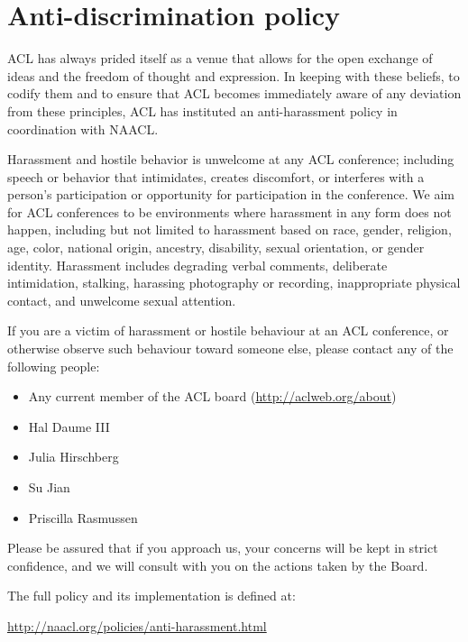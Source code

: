 \section[Anti-discrimination policy]{Anti-discrimination policy}
\thispagestyle{emptyheader}
\setheaders{}{}

ACL has always prided itself as a venue that allows for the open
exchange of ideas and the freedom of thought and expression. In
keeping with these beliefs, to codify them and to ensure that ACL
becomes immediately aware of any deviation from these principles, ACL
has instituted an anti-harassment policy in coordination with NAACL.

Harassment and hostile behavior is unwelcome at any ACL conference;
including speech or behavior that intimidates, creates discomfort, or
interferes with a person's participation or opportunity for
participation in the conference. We aim for ACL conferences to be
environments where harassment in any form does not happen, including
but not limited to harassment based on race, gender, religion, age,
color, national origin, ancestry, disability, sexual orientation, or
gender identity. Harassment includes degrading verbal comments,
deliberate intimidation, stalking, harassing photography or recording,
inappropriate physical contact, and unwelcome sexual attention.

If you are a victim of harassment or hostile behaviour at an ACL
conference, or otherwise observe such behaviour toward someone else,
please contact any of the following people:

\begin{itemize}
\item Any current member of the ACL board (\url{http://aclweb.org/about})
\item Hal Daume III 
\item Julia Hirschberg 
\item Su Jian 
\item Priscilla Rasmussen 
\end{itemize}

Please be assured that if you approach us, your concerns will be kept
in strict confidence, and we will consult with you on the actions
taken by the Board.

The full policy and its implementation is defined at:

\url{http://naacl.org/policies/anti-harassment.html}
